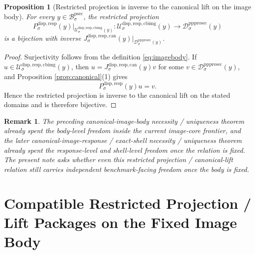 \documentclass[11pt]{article}
\newcommand{\ProtoSectionBody}[1]{\mathcal B_{#1}^{\mathrm{psec}}}
\newcommand{\PrePreProtoSectionResidualBody}[1]{\mathcal D_{#1}^{\mathrm{pppresec}}}
\newcommand{\SubstrateProjection}[1]{P_{#1}^{\mathrm{disp,resp}}}
\newcommand{\CanonicalLift}[1]{J_{#1}^{\mathrm{disp,resp,can}}}
\newcommand{\CanonicalImageBody}[1]{\mathcal U_{#1}^{\mathrm{disp,resp,cbimg}}}
\newtheorem{proposition}{Proposition}
\newtheorem{remark}{Remark}
\begin{document}
\begin{proposition}[Restricted projection is inverse to the canonical lift on the image body]
\label{prop:restricted}
For every \(y\in\ProtoSectionBody{\sigma}\), the restricted projection
\[
\SubstrateProjection{\sigma}(y)\big|_{\CanonicalImageBody{\sigma}(y)}
:
\CanonicalImageBody{\sigma}(y)\to\PrePreProtoSectionResidualBody{\sigma}(y)
\]
is a bijection with inverse \(\CanonicalLift{\sigma}(y)\big|_{\PrePreProtoSectionResidualBody{\sigma}(y)}\).
\end{proposition}

\begin{proof}
Surjectivity follows from the definition \eqref{eq:imagebody}. If \(u\in\CanonicalImageBody{\sigma}(y)\), then \(u=\CanonicalLift{\sigma}(y)v\) for some \(v\in\PrePreProtoSectionResidualBody{\sigma}(y)\), and Proposition \ref{prop:canonical}(1) gives
\[
\SubstrateProjection{\sigma}(y)u=v.
\]
Hence the restricted projection is inverse to the canonical lift on the stated domains and is therefore bijective.
\end{proof}

\begin{remark}
The preceding canonical-image-body necessity / uniqueness theorem already spent the body-level freedom inside the current image-core frontier, and the later canonical-image-response / exact-shell necessity / uniqueness theorem already spent the response-level and shell-level freedom once the relation is fixed. The present note asks whether even this restricted projection / canonical-lift relation still carries independent benchmark-facing freedom once the body is fixed.
\end{remark}

\section{Compatible Restricted Projection / Lift Packages on the Fixed Image Body}
\end{document}
